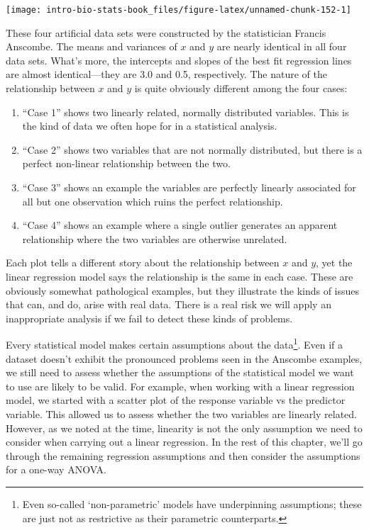 \documentclass[
]{book}
\begin{document}
\begin{center}\texttt{[image: intro-bio-stats-book\_files/figure-latex/unnamed-chunk-152-1]} \end{center}

These four artificial data sets were constructed by the statistician Francis Anscombe. The means and variances of \(x\) and \(y\) are nearly identical in all four data sets. What's more, the intercepts and slopes of the best fit regression lines are almost identical---they are 3.0 and 0.5, respectively. The nature of the relationship between \(x\) and \(y\) is quite obviously different among the four cases:

\begin{enumerate}
\def\labelenumi{\arabic{enumi}.}
\item
  ``Case 1'' shows two linearly related, normally distributed variables. This is the kind of data we often hope for in a statistical analysis.
\item
  ``Case 2'' shows two variables that are not normally distributed, but there is a perfect non-linear relationship between the two.
\item
  ``Case 3'' shows an example the variables are perfectly linearly associated for all but one observation which ruins the perfect relationship.
\item
  ``Case 4'' shows an example where a single outlier generates an apparent relationship where the two variables are otherwise unrelated.
\end{enumerate}

Each plot tells a different story about the relationship between \(x\) and \(y\), yet the linear regression model says the relationship is the same in each case. These are obviously somewhat pathological examples, but they illustrate the kinds of issues that can, and do, arise with real data. There is a real risk we will apply an inappropriate analysis if we fail to detect these kinds of problems.

Every statistical model makes certain assumptions about the data\footnote{Even so-called `non-parametric' models have underpinning assumptions; these are just not as restrictive as their parametric counterparts.}. Even if a dataset doesn't exhibit the pronounced problems seen in the Anscombe examples, we still need to assess whether the assumptions of the statistical model we want to use are likely to be valid. For example, when working with a linear regression model, we started with a scatter plot of the response variable vs the predictor variable. This allowed us to assess whether the two variables are linearly related. However, as we noted at the time, linearity is not the only assumption we need to consider when carrying out a linear regression. In the rest of this chapter, we'll go through the remaining regression assumptions and then consider the assumptions for a one-way ANOVA.
\end{document}
